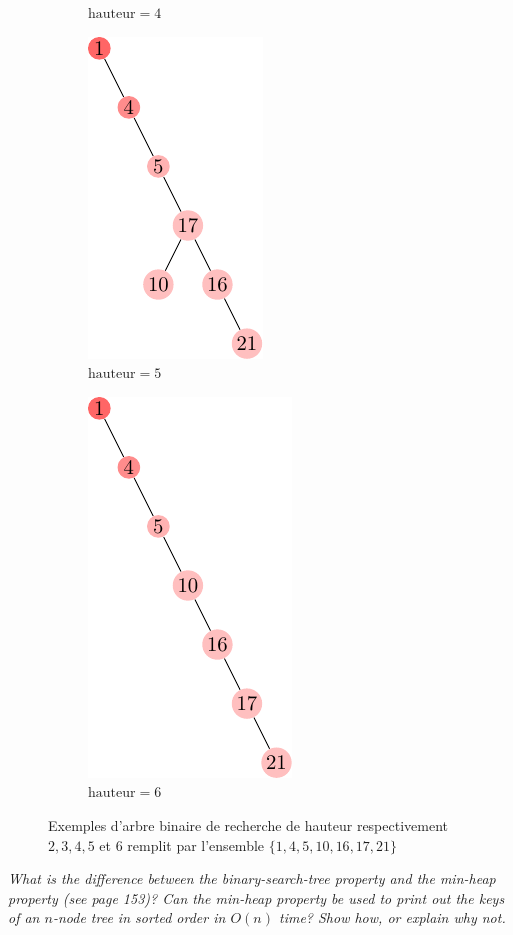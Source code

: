 \begin{description}
\begin{ex}
\begin{figure}[H]
\begin{subfigure}[t]{.30\textwidth}
        \caption{$\text{hauteur} = 4 $}\label{fig:12_1-1_3}
      \end{subfigure}
      \begin{subfigure}[t]{.30\textwidth}
        \centering
        \includegraphics[scale=1]{img/12_1-1/12_1-1_4.pdf}
        \caption{$\text{hauteur} = 5 $}\label{fig:12_1-1_4}
      \end{subfigure}
      \begin{subfigure}[t]{.30\textwidth}
        \centering
        \includegraphics[scale=1]{img/12_1-1/12_1-1_5.pdf}
        \caption{$\text{hauteur} = 6 $}\label{fig:12_1-1_5}
      \end{subfigure}
      \caption{Exemples d'arbre binaire de recherche de hauteur respectivement $2, 3, 4, 5$ et $6$ remplit par l'ensemble $\{1, 4, 5, 10, 16, 17, 21\}$}
      \label{fig:binary-search-tree} 
    \end{figure}
\end{ex}
 \textit{What is the difference between the binary-search-tree property and the min-heap property (see page 153)? Can the min-heap property be used to print out the keys of an $n$-node tree in sorted order in $O(n)$ time? Show how, or explain why not.}


\end{description}
